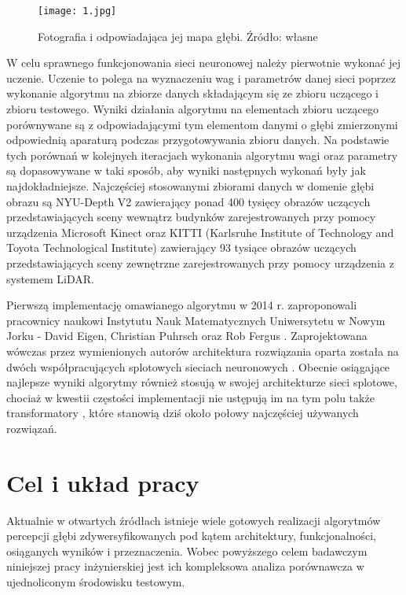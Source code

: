 \begin{figure}[H]
        \centering
        \texttt{[image: 1.jpg]}
        \caption{Fotografia i odpowiadająca jej mapa głębi. Źródło: własne}
        \label{fig:depthmap}
 \end{figure}

W celu sprawnego funkcjonowania sieci neuronowej należy pierwotnie wykonać jej uczenie. Uczenie to polega na wyznaczeniu wag i parametrów danej sieci poprzez wykonanie algorytmu na zbiorze danych składającym się ze zbioru uczącego i zbioru testowego. Wyniki działania algorytmu na elementach zbioru uczącego porównywane są z odpowiadającymi tym elementom danymi o głębi zmierzonymi odpowiednią aparaturą podczas przygotowywania zbioru danych. Na podstawie tych porównań w kolejnych iteracjach wykonania algorytmu wagi oraz parametry są dopasowywane w taki sposób, aby wyniki następnych wykonań były jak najdokładniejsze. Najczęściej stosowanymi zbiorami danych w domenie głębi obrazu są NYU-Depth V2 \cite{couprie2013} zawierający  ponad 400 tysięcy obrazów uczących przedstawiających sceny wewnątrz budynków zarejestrowanych przy pomocy urządzenia Microsoft Kinect oraz KITTI (Karlsruhe Institute of Technology and Toyota Technological Institute) \cite{geiger2012} zawierający 93 tysiące obrazów uczących przedstawiających sceny zewnętrzne zarejestrowanych przy pomocy urządzenia z systemem LiDAR.

Pierwszą implementację omawianego algorytmu w 2014 r. zaproponowali pracownicy naukowi Instytutu Nauk Matematycznych Uniwersytetu w Nowym Jorku - David Eigen, Christian Puhrsch oraz Rob Fergus \cite{eigen2014}. Zaprojektowana wówczas przez wymienionych autorów architektura rozwiązania oparta została na dwóch współpracujących splotowych sieciach neuronowych \cite{oshea2015}. Obecnie osiągające najlepsze wyniki algorytmy również stosują w swojej architekturze sieci splotowe, chociaż w kwestii częstości implementacji nie ustępują im na tym polu także transformatory \cite{vaswani2017}, które stanowią dziś około połowy najczęściej używanych rozwiązań.

\section{Cel i układ pracy}
Aktualnie w otwartych źródłach istnieje wiele gotowych realizacji algorytmów percepcji głębi zdywersyfikowanych pod kątem architektury, funkcjonalności, osiąganych wyników i przeznaczenia. Wobec powyższego celem badawczym niniejszej pracy inżynierskiej jest ich kompleksowa analiza porównawcza w ujednoliconym środowisku testowym.

